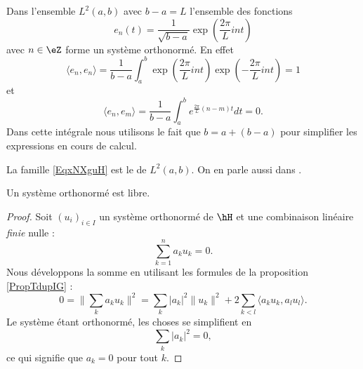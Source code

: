 \begin{example}
    Dans l'ensemble \( L^2(a,b)\) avec \( b-a=L\) l'ensemble des fonctions
    \begin{equation}        \label{EqxNXguH}
        e_n(t)=\frac{1}{ \sqrt{b-a} }\exp(\frac{ 2\pi }{ L }int)
    \end{equation}
    avec \( n\in \eZ\) forme un système orthonormé. En effet
    \begin{equation}
        \langle e_n, e_n\rangle =\frac{1}{ b-a }\int_a^b\exp(\frac{ 2\pi }{ L }int)\exp(-\frac{ 2\pi }{ L }int)=1
    \end{equation}
    et
    \begin{equation}
        \langle e_n, e_m\rangle =\frac{1}{ b-a }\int_a^b e^{\frac{ 2\pi }{ L }(n-m)t}dt=0.
    \end{equation}
    Dans cette intégrale nous utilisons le fait que \( b=a+(b-a)\) pour simplifier les expressions en cours de calcul.

    La famille \eqref{EqxNXguH} est le  de \( L^2(a,b)\). On en parle aussi dans \cite{KuttlerTopInAl}.
\end{example}

\begin{proposition}
    Un système orthonormé est libre.
\end{proposition}

\begin{proof}
    Soit \( (u_i)_{i\in I}\) un système orthonormé de \( \hH\) et une combinaison linéaire \emph{finie} nulle :
    \begin{equation}
        \sum_{k=1}^{n}a_ku_k=0.
    \end{equation}
    Nous développons la somme en utilisant les formules de la proposition \ref{PropTdupIG} :
    \begin{equation}
        0=\| \sum_ka_ku_k \|^2=\sum_k| a_k |^2\| u_k \|^2+2\sum_{k<l}\langle a_ku_k, a_lu_l\rangle .
    \end{equation}
    Le système étant orthonormé, les choses se simplifient en
    \begin{equation}
        \sum_k| a_k |^2=0,
    \end{equation}
    ce qui signifie que \( a_k=0\) pour tout \( k\).
\end{proof}

